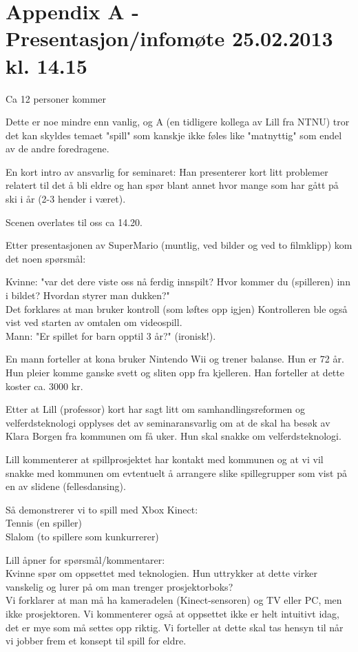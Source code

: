 \appendix

\section*{Appendix A - Presentasjon/infomøte 25.02.2013 kl. 14.15}
\label{A}

Ca 12 personer kommer

Dette er noe mindre enn vanlig, og A (en tidligere kollega av Lill fra NTNU) tror det kan skyldes temaet "spill" som kanskje ikke føles like "matnyttig" som endel av de andre foredragene.

En kort intro av ansvarlig for seminaret: Han presenterer kort litt problemer relatert til det å bli eldre og han spør blant annet hvor mange som har gått på ski i år (2-3 hender i været).

Scenen overlates til oss ca 14.20.

Etter presentasjonen av SuperMario (muntlig, ved bilder og ved to filmklipp) kom det noen spørsmål:

Kvinne: "var det dere viste oss nå ferdig innspilt? Hvor kommer du (spilleren) inn i bildet? Hvordan styrer man dukken?" \\
Det forklares at man bruker kontroll (som løftes opp igjen)
Kontrolleren ble også vist ved starten av omtalen om videospill. \\
Mann: "Er spillet for barn opptil 3 år?" (ironisk!).

En mann forteller at kona bruker Nintendo Wii og trener balanse. Hun er 72 år. Hun pleier komme ganske svett og sliten opp fra kjelleren. Han forteller at dette koster ca. 3000 kr.

Etter at Lill (professor) kort har sagt litt om samhandlingsreformen og velferdsteknologi opplyses det av seminaransvarlig om at de skal ha besøk av Klara Borgen fra kommunen om få uker. Hun skal snakke om velferdsteknologi.

Lill kommenterer at spillprosjektet har kontakt med kommunen og at vi vil snakke med kommunen om evtentuelt å arrangere slike spillegrupper 
som vist på en av slidene (fellesdansing).

Så demonstrerer vi to spill med Xbox Kinect: \\
Tennis (en spiller)\\
Slalom (to spillere som kunkurrerer)

Lill åpner for spørsmål/kommentarer: \\
Kvinne spør om oppsettet med teknologien. Hun uttrykker at dette virker vanskelig og lurer på om man trenger prosjektorboks?\\
Vi forklarer at man må ha kameradelen (Kinect-sensoren) og TV eller PC, men ikke prosjektoren.
Vi kommenterer også at oppsettet ikke er helt intuitivt idag, det er mye som må settes opp riktig. Vi forteller at dette skal tas hensyn til når vi jobber frem et konsept til spill for eldre.

